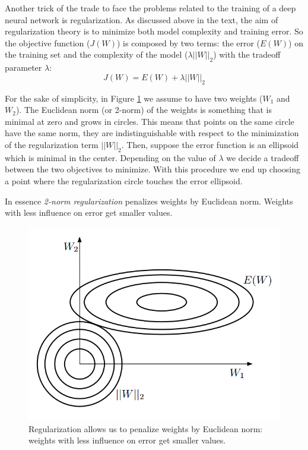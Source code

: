 Another trick of the trade to face the problems related to the training of a deep neural network is regularization. As discussed above in the text, the aim of regularization theory is to minimize both model complexity and training error. So the objective function ($J(W)$) is composed by two terms: the error ($E(W)$) on the training set and the complexity of the model ($\lambda ||W||_2$) with the tradeoff parameter $\lambda$:
$$J(W) = E(W)+\lambda ||W||_2$$

For the sake of simplicity, in Figure \ref{fig:deep_regularization} we assume to have two weights ($W_1$ and $W_2$). The Euclidean norm (or 2-norm) of the weights is something that is minimal at zero and grows in circles. This means that points on the same circle have the same norm, they are indistinguishable with respect to the minimization of the regularization term $||W||_2$. Then, suppose the error function is an ellipsoid which is minimal in the center. Depending on the value of $\lambda$ we decide a tradeoff between the two objectives to minimize. With this procedure we end up choosing a point where the regularization circle touches the error ellipsoid. \newline

In essence \textit{2-norm regularization} penalizes weights by Euclidean norm. Weights with less influence on error get smaller values. \newline

\begin{figure}
    \centering
    \includegraphics[scale=0.5]{images/deepRegularization.png}
    \caption{Regularization allows us to penalize weights by Euclidean norm: weights with less influence on error get smaller values.}
    \label{fig:deep_regularization}
\end{figure}

